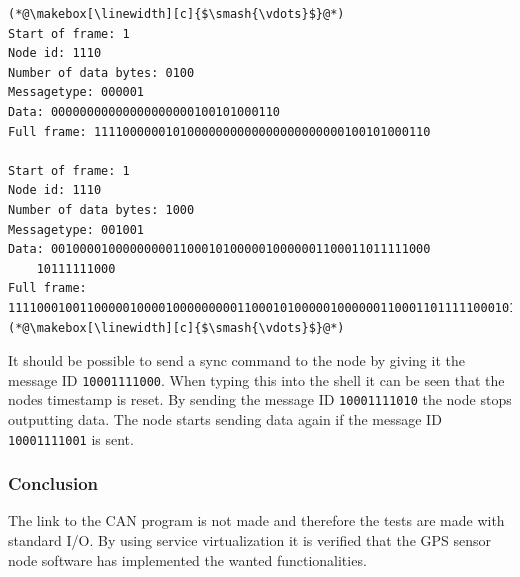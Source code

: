 \begin{lstlisting}[caption=Struct for data packet.,label=code:output_node]
(*@\makebox[\linewidth][c]{$\smash{\vdots}$}@*)
Start of frame: 1
Node id: 1110
Number of data bytes: 0100
Messagetype: 000001
Data: 00000000000000000000100101000110
Full frame: 11110000001010000000000000000000000100101000110

Start of frame: 1
Node id: 1110
Number of data bytes: 1000
Messagetype: 001001
Data: 00100001000000000110001010000010000001100011011111000
	10111111000
Full frame: 1111000100110000010000100000000011000101000001000000110001101111100010111111000
(*@\makebox[\linewidth][c]{$\smash{\vdots}$}@*)
\end{lstlisting}

It should be possible to send a sync command to the node by giving it the message ID \texttt{10001111000}.
When typing this into the shell it can be seen that the nodes timestamp is reset.
By sending the message ID \texttt{10001111010} the node stops outputting data.
The node starts sending data again if the message ID \texttt{10001111001} is sent.


\subsubsection*{Conclusion}
The link to the CAN program is not made and therefore the tests are made with standard I/O.
By using service virtualization it is verified that the GPS sensor node software has implemented the wanted functionalities.
